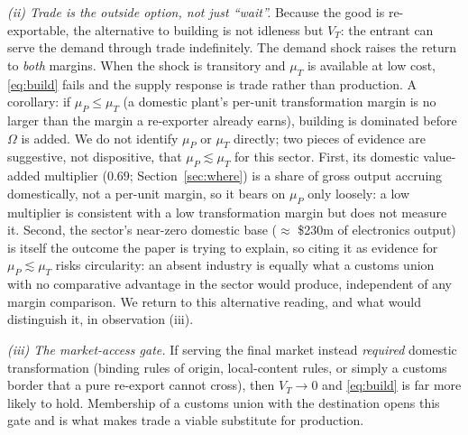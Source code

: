 \documentclass[12pt]{article}
\begin{document}
\emph{(ii) Trade is the outside option, not just ``wait''.} Because the good is re-exportable,
the alternative to building is not idleness but $V_T$: the entrant can serve the demand
through trade indefinitely. The demand shock raises the return to \emph{both} margins. When
the shock is transitory and $\mu_T$ is available at low cost, \eqref{eq:build} fails and the
supply response is trade rather than production. A corollary: if $\mu_P \le \mu_T$ (a domestic
plant's per-unit transformation margin is no larger than the margin a re-exporter already
earns), building is dominated before $\Omega$ is added. We do not identify $\mu_P$ or $\mu_T$
directly; two pieces of evidence are suggestive, not dispositive, that $\mu_P \lesssim \mu_T$
for this sector. First, its domestic value-added multiplier ($0.69$; Section~\ref{sec:where})
is a share of gross output accruing domestically, not a per-unit margin, so it bears on
$\mu_P$ only loosely: a low multiplier is consistent with a low transformation margin but does
not measure it. Second, the sector's near-zero domestic base ($\approx$ \$230m of electronics
output) is itself the outcome the paper is trying to explain, so citing it as evidence for
$\mu_P \lesssim \mu_T$ risks circularity: an absent industry is equally what a customs union
with no comparative advantage in the sector would produce, independent of any margin
comparison. We return to this alternative reading, and what would distinguish it, in
observation (iii).

\emph{(iii) The market-access gate.} If serving the final market instead \emph{required}
domestic transformation (binding rules of origin, local-content rules, or simply a customs
border that a pure re-export cannot cross), then $V_T \to 0$ and \eqref{eq:build} is far more
likely to hold. Membership of a customs union with the destination opens this gate and is
what makes trade a viable substitute for production.
\end{document}
